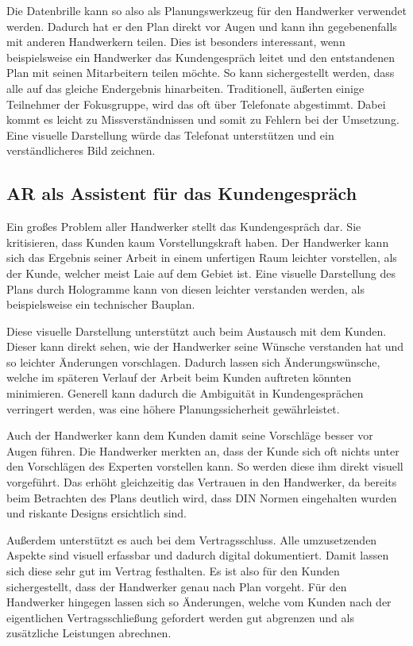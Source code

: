 Die Datenbrille kann so also als Planungswerkzeug für den Handwerker verwendet werden. Dadurch hat er den Plan direkt vor Augen und kann ihn gegebenenfalls mit anderen Handwerkern teilen. Dies ist besonders interessant, wenn beispielsweise ein Handwerker das Kundengespräch leitet und den entstandenen Plan mit seinen Mitarbeitern teilen möchte. So kann sichergestellt werden, dass alle auf das gleiche Endergebnis hinarbeiten. Traditionell, äußerten einige Teilnehmer der Fokusgruppe, wird das oft über Telefonate abgestimmt. Dabei kommt es leicht zu Missverständnissen und somit zu Fehlern bei der Umsetzung. Eine visuelle Darstellung würde das Telefonat unterstützen und ein verständlicheres Bild zeichnen.

\subsection{AR als Assistent für das Kundengespräch}

Ein großes Problem aller Handwerker stellt das Kundengespräch dar. Sie kritisieren, dass Kunden kaum Vorstellungskraft haben. Der Handwerker kann sich das Ergebnis seiner Arbeit in einem unfertigen Raum leichter vorstellen, als der Kunde, welcher meist Laie auf dem Gebiet ist. Eine visuelle Darstellung des Plans durch Hologramme kann von diesen leichter verstanden werden, als beispielsweise ein technischer Bauplan. 

Diese visuelle Darstellung unterstützt auch beim Austausch mit dem Kunden. Dieser kann direkt sehen, wie der Handwerker seine Wünsche verstanden hat und so leichter Änderungen vorschlagen. Dadurch lassen sich Änderungswünsche, welche im späteren Verlauf der Arbeit beim Kunden auftreten könnten minimieren. Generell kann dadurch die Ambiguität in Kundengesprächen verringert werden, was eine höhere Planungssicherheit gewährleistet. 

Auch der Handwerker kann dem Kunden damit seine Vorschläge besser vor Augen führen. Die Handwerker merkten an, dass der Kunde sich oft nichts unter den Vorschlägen des Experten vorstellen kann. So werden diese ihm direkt visuell vorgeführt. Das erhöht gleichzeitig das Vertrauen in den Handwerker, da bereits beim Betrachten des Plans deutlich wird, dass DIN Normen eingehalten wurden und riskante Designs ersichtlich sind. 

Außerdem unterstützt es auch bei dem Vertragsschluss. Alle umzusetzenden Aspekte sind visuell erfassbar und dadurch digital dokumentiert. Damit lassen sich diese sehr gut im Vertrag festhalten. Es ist also für den Kunden sichergestellt, dass der Handwerker genau nach Plan vorgeht. Für den Handwerker hingegen lassen sich so Änderungen, welche vom Kunden nach der eigentlichen Vertragsschließung gefordert werden gut abgrenzen und als zusätzliche Leistungen abrechnen. 

